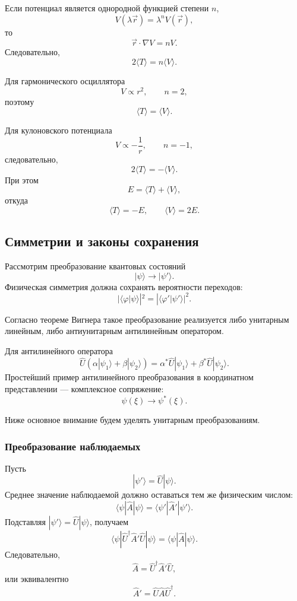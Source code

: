 \documentclass[12pt,a4paper]{article}
\begin{document}
Если потенциал является однородной функцией степени $n$,
\[
    V(\lambda\vec r)=\lambda^nV(\vec r),
\]
то
\[
    \vec r\cdot\nabla V=nV.
\]
Следовательно,
\[
    \boxed{
        2\langle T\rangle
        =
        n\langle V\rangle
    }.
\]

Для гармонического осциллятора
\[
    V\propto r^2,
    \qquad
    n=2,
\]
поэтому
\[
    \boxed{
        \langle T\rangle
        =
        \langle V\rangle
    }.
\]

Для кулоновского потенциала
\[
    V\propto-\frac1r,
    \qquad
    n=-1,
\]
следовательно,
\[
    2\langle T\rangle
    =
    -\langle V\rangle.
\]
При этом
\[
    E=\langle T\rangle+\langle V\rangle,
\]
откуда
\[
    \boxed{
        \langle T\rangle=-E,
        \qquad
        \langle V\rangle=2E
    }.
\]


\subsection{Симметрии и законы сохранения}

Рассмотрим преобразование квантовых состояний
\[
    |\psi\rangle
    \longrightarrow
    |\psi'\rangle.
\]
Физическая симметрия должна сохранять вероятности переходов:
\[
    \boxed{
        |\langle\varphi|\psi\rangle|^2
        =
        |\langle\varphi'|\psi'\rangle|^2
    }.
\]

Согласно теореме Вигнера такое преобразование реализуется либо
унитарным линейным, либо антиунитарным антилинейным оператором.

Для антилинейного оператора
\[
    \boxed{
    \hat U
    \left(
        \alpha|\psi_1\rangle
        +
        \beta|\psi_2\rangle
    \right)
    =
    \alpha^*\hat U|\psi_1\rangle
    +
    \beta^*\hat U|\psi_2\rangle
    }.
\]
Простейший пример антилинейного преобразования в координатном
представлении --- комплексное сопряжение:
\[
    \psi(\xi)\longrightarrow\psi^*(\xi).
\]

Ниже основное внимание будем уделять унитарным преобразованиям.


\subsubsection{Преобразование наблюдаемых}

Пусть
\[
    |\psi'\rangle=\hat U|\psi\rangle.
\]
Среднее значение наблюдаемой должно оставаться тем же физическим
числом:
\[
    \langle\psi|\hat A|\psi\rangle
    =
    \langle\psi'|\hat A'|\psi'\rangle.
\]
Подставляя $|\psi'\rangle=\hat U|\psi\rangle$, получаем
\[
    \langle\psi|
        \hat U^\dagger\hat A'\hat U
    |\psi\rangle
    =
    \langle\psi|\hat A|\psi\rangle.
\]
Следовательно,
\[
    \boxed{
        \hat A
        =
        \hat U^\dagger\hat A'\hat U
    },
\]
или эквивалентно
\[
    \boxed{
        \hat A'
        =
        \hat U\hat A\hat U^\dagger
    }.
\]
\end{document}

